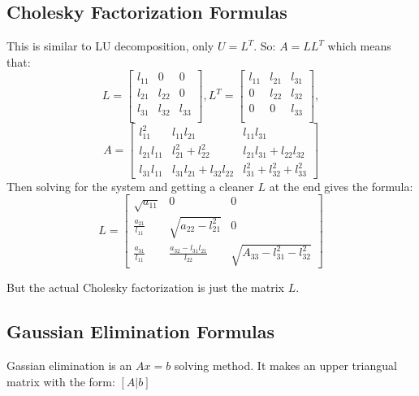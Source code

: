 \subsection*{Cholesky Factorization Formulas}
This is similar to LU decomposition, only $U = L^T$. So: $A = L L^T$ which means
that:
\[
L =
\begin{bmatrix}
  l_{11} & 0 & 0 \\
  l_{21} & l_{22} & 0 \\
  l_{31} & l_{32} & l_{33} \\
\end{bmatrix},
L^T =
\begin{bmatrix}
  l_{11} & l_{21} & l_{31} \\
  0 & l_{22} & l_{32} \\
  0 & 0 & l_{33} \\
\end{bmatrix},
\]
\vspace{42mm}
\[
A =
\begin{bmatrix}
  l_{11}^2 & l_{11}l_{21} & l_{11}l_{31} \\
  l_{21}l_{11} & l_{21}^2 + l_{22}^2 & l_{21}l_{31} + l_{22}l_{32}\\
  l_{31}l_{11} & l_{31}l_{21} + l_{32}l_{22} & l_{31}^2 + l_{32}^2 + l_{33}^2
\end{bmatrix}
\]
Then solving for the system and getting a cleaner $L$ at the end gives the formula:
\[
L =
\begin{bmatrix}
\sqrt{a_{11}} & 0 & 0 \\
\frac{a_{21}}{l_{11}} & \sqrt{a_{22} - l_{21}^2} & 0 \\
\frac{a_{31}}{l_{11}} & \frac{a_{32} - l_{31}l_{21}}{l_{22}} & \sqrt{A_{33} - l_{31}^2 - l_{32}^2}
\end{bmatrix}
\]

But the actual Cholesky factorization is just the matrix $L$.

\subsection*{Gaussian Elimination Formulas}
Gassian elimination is an $Ax = b$ solving method. It makes an upper triangual matrix
with the form: $[A | b] $
\newline
\\~















